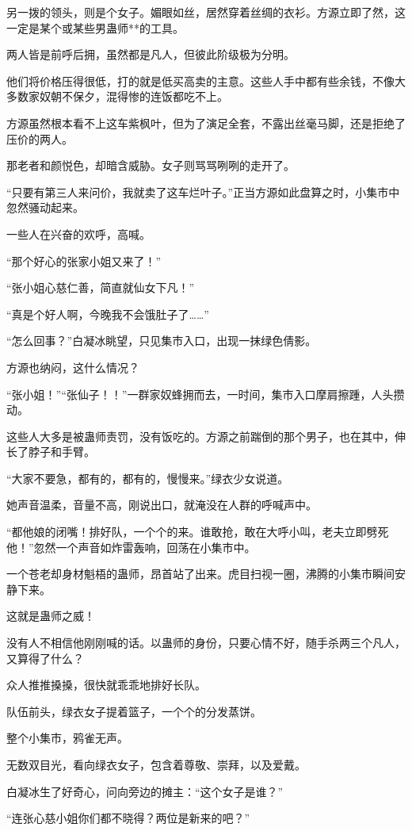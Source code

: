 \begin{this_body}
另一拨的领头，则是个女子。媚眼如丝，居然穿着丝绸的衣衫。方源立即了然，这一定是某个或某些男蛊师**的工具。

两人皆是前呼后拥，虽然都是凡人，但彼此阶级极为分明。

他们将价格压得很低，打的就是低买高卖的主意。这些人手中都有些余钱，不像大多数家奴朝不保夕，混得惨的连饭都吃不上。

方源虽然根本看不上这车紫枫叶，但为了演足全套，不露出丝毫马脚，还是拒绝了压价的两人。

那老者和颜悦色，却暗含威胁。女子则骂骂咧咧的走开了。

“只要有第三人来问价，我就卖了这车烂叶子。”正当方源如此盘算之时，小集市中忽然骚动起来。

一些人在兴奋的欢呼，高喊。

“那个好心的张家小姐又来了！”

“张小姐心慈仁善，简直就仙女下凡！”

“真是个好人啊，今晚我不会饿肚子了……”

“怎么回事？”白凝冰眺望，只见集市入口，出现一抹绿色倩影。

方源也纳闷，这什么情况？

“张小姐！”“张仙子！！”一群家奴蜂拥而去，一时间，集市入口摩肩擦踵，人头攒动。

这些人大多是被蛊师责罚，没有饭吃的。方源之前踹倒的那个男子，也在其中，伸长了脖子和手臂。

“大家不要急，都有的，都有的，慢慢来。”绿衣少女说道。

她声音温柔，音量不高，刚说出口，就淹没在人群的呼喊声中。

“都他娘的闭嘴！排好队，一个个的来。谁敢抢，敢在大呼小叫，老夫立即劈死他！”忽然一个声音如炸雷轰响，回荡在小集市中。

一个苍老却身材魁梧的蛊师，昂首站了出来。虎目扫视一圈，沸腾的小集市瞬间安静下来。

这就是蛊师之威！

没有人不相信他刚刚喊的话。以蛊师的身份，只要心情不好，随手杀两三个凡人，又算得了什么？

众人推推搡搡，很快就乖乖地排好长队。

队伍前头，绿衣女子提着篮子，一个个的分发蒸饼。

整个小集市，鸦雀无声。

无数双目光，看向绿衣女子，包含着尊敬、崇拜，以及爱戴。

白凝冰生了好奇心，问向旁边的摊主：“这个女子是谁？”

“连张心慈小姐你们都不晓得？两位是新来的吧？”


\end{this_body}
